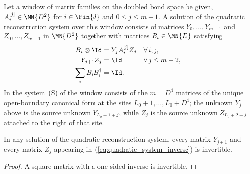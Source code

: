 \begin{definition}
    \label{def:pgvwc07_quadratic_system}
    \leanok
    Let a window of matrix families on the doubled bond space be given,
    $A^{[j]}_i\in\MN{D^2}$ for $i\in\Fin{d}$ and $0\le j\le m-1$. A solution
    of the quadratic reconstruction system over this window consists of
    matrices $Y_0,\ldots,Y_{m-1}$ and $Z_0,\ldots,Z_{m-1}$ in $\MN{D^2}$
    together with matrices $B_i\in\MN{D}$ satisfying
    \begin{align}
        B_i\otimes\Id           & = Y_j A^{[j]}_i Z_j &  & \forall\, i,j,
        \label{eq:quadratic_system_gauge}                                      \\
        Y_{j+1}Z_j              & = \Id               &  & \forall\, j\le m-2,
        \label{eq:quadratic_system_inverse}                                    \\
        \sum_i B_iB_i^{\dagger} & = \Id.
        \label{eq:quadratic_system_normalization}
    \end{align}
    In the system~(S) of \cite{PerezGarcia2007Matrix} the window consists of
    the $m=D^4$ matrices of the unique open-boundary canonical form at the
    sites $L_0+1,\ldots,L_0+D^4$; the unknown $Y_j$ above is the source
    unknown $Y_{L_0+1+j}$, while $Z_j$ is the source unknown
    $Z_{L_0+2+j}$ attached to the right of that site.
\end{definition}

\begin{lemma}
    \label{lem:pgvwc07_quadratic_system_units}
    \leanok
    In any solution of the quadratic reconstruction system, every matrix
    $Y_{j+1}$ and every matrix $Z_j$ appearing
    in~(\ref{eq:quadratic_system_inverse}) is invertible.
\end{lemma}

\begin{proof}
    \leanok
    A square matrix with a one-sided inverse is invertible.
\end{proof}

